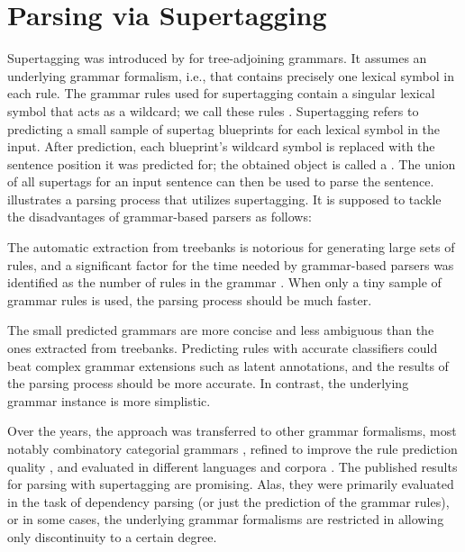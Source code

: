 \documentclass[../document.tex]{subfiles}
\begin{document}
    \section*{Parsing via Supertagging}
    Supertagging was introduced by \citet{bangalore1999supertagging} for tree-adjoining grammars.
    It assumes an underlying  grammar formalism, i.e.\@, that contains precisely one lexical symbol in each rule.
    The grammar rules used for supertagging contain a singular lexical symbol that acts as a wildcard; we call these rules .
    Supertagging refers to predicting a small sample of supertag blueprints for each lexical symbol in the input.
    After prediction, each blueprint's wildcard symbol is replaced with the sentence position it was predicted for; the obtained object is called a .
    The union of all supertags for an input sentence can then be used to parse the sentence.
     illustrates a parsing process that utilizes supertagging.
    It is supposed to tackle the disadvantages of grammar-based parsers as follows:
    \begin{compactitem}
        \item The automatic extraction from treebanks is notorious for generating large sets of rules, and a significant factor for the time needed by grammar-based parsers was identified as the number of rules in the grammar \citep{dunlop2010reducing}.
            When only a tiny sample of grammar rules is used, the parsing process should be much faster.
        \item The small predicted grammars are more concise and less ambiguous than the ones extracted from treebanks.
            Predicting rules with accurate classifiers could beat complex grammar extensions such as latent annotations, and the results of the parsing process should be more accurate. In contrast, the underlying grammar instance is more simplistic.
    \end{compactitem}
    Over the years, the approach was transferred to other grammar formalisms, most notably combinatory categorial grammars \citep{Clark04}, refined to improve the rule prediction quality \citep{vaswani2016supertagging,Kad18,tian20}, and evaluated in different languages and corpora \citep{Bla18}.
    The published results for parsing with supertagging are promising.
    Alas, they were primarily evaluated in the task of dependency parsing (or just the prediction of the grammar rules), or in some cases, the underlying grammar formalisms are restricted in allowing only discontinuity to a certain degree.
\end{document}
